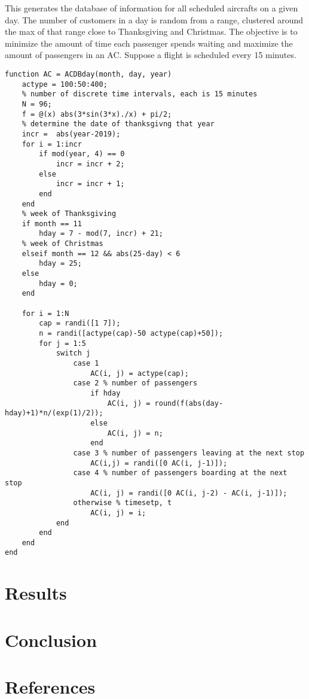 \documentclass[12pt]{article}
\begin{document}
\begin{par}
This generates the database of information for all scheduled aircrafts on a given day. The number of customers in a day is random from a range, clustered around the max of that range close to Thanksgiving and Christmas. The objective is to minimize the amount of time each passenger spends waiting and maximize the amount of passengers in an AC. Suppose a flight is scheduled every 15 minutes.
\end{par} \vspace{1em}
\begin{verbatim}
function AC = ACDBday(month, day, year)
    actype = 100:50:400;
    % number of discrete time intervals, each is 15 minutes
    N = 96;
    f = @(x) abs(3*sin(3*x)./x) + pi/2;
    % determine the date of thanksgivng that year
    incr =  abs(year-2019);
    for i = 1:incr
        if mod(year, 4) == 0
            incr = incr + 2;
        else
            incr = incr + 1;
        end
    end
    % week of Thanksgiving
    if month == 11
        hday = 7 - mod(7, incr) + 21;
    % week of Christmas
    elseif month == 12 && abs(25-day) < 6
        hday = 25;
    else
        hday = 0;
    end

    for i = 1:N
        cap = randi([1 7]);
        n = randi([actype(cap)-50 actype(cap)+50]);
        for j = 1:5
            switch j
                case 1
                    AC(i, j) = actype(cap);
                case 2 % number of passengers
                    if hday
                        AC(i, j) = round(f(abs(day-hday)+1)*n/(exp(1)/2));
                    else
                        AC(i, j) = n;
                    end
                case 3 % number of passengers leaving at the next stop
                    AC(i,j) = randi([0 AC(i, j-1)]);
                case 4 % number of passengers boarding at the next stop
                    AC(i, j) = randi([0 AC(i, j-2) - AC(i, j-1)]);
                otherwise % timesetp, t
                    AC(i, j) = i;
            end
        end
    end
end
\end{verbatim}

\subsection{}

\section{Results}

\section{Conclusion}

\section{References}
\end{document}
